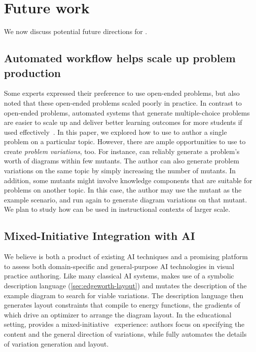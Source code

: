 \section{Future work}

We now discuss potential future directions for \Edgeworth. 


\subsection{Automated workflow helps scale up problem production}

Some experts expressed their preference to use open-ended problems, but also noted that these open-ended problems scaled poorly in practice. In contrast to open-ended problems, automated systems that generate multiple-choice problems are easier to scale up and deliver better learning outcomes for more students if used effectively~\cite{Wang2021}. In this paper, we explored how to use \Edgeworth to author a single problem on a particular topic. However, there are ample opportunities to use \Edgeworth to create \textit{problem variations}, too. For instance, \Edgeworth can reliably generate a problem's worth of diagrams within few mutants. The author can also generate problem variations on the same topic by simply increasing the number of mutants. In addition, some \Edgeworth mutants might involve knowledge components that are suitable for problems on another topic. In this case, the author may use the mutant as the example scenario, and run \Edgeworth again to generate diagram variations on that mutant. We plan to study how \Edgeworth can be used in instructional contexts of larger scale.


\subsection{Mixed-Initiative Integration with AI}

We believe \Edgeworth is both a product of existing AI techniques and a promising platform to assess both domain-specific and general-purpose AI technologies in visual practice authoring. Like many classical AI systems, \Edgeworth makes use of a symbolic description language (\cref{sec:edgeworth-layout}) and mutates the description of the example diagram to search for viable variations. The description language then generates layout constraints that compile to energy functions, the gradients of which drive an optimizer to arrange the diagram layout. In the educational setting, \Edgeworth provides a mixed-initiative~\cite{allen1999mixedinitiative} experience: authors focus on specifying the content and the general direction of variations, while \Edgeworth fully automates the details of variation generation and layout. 


